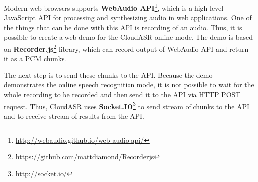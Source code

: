 Modern web browsers supports \textbf{WebAudio API}\footnote{\url{http://webaudio.github.io/web-audio-api/}},
  which is a high-level JavaScript API for processing and synthesizing audio in web applications.
One of the things that can be done with this API is recording of an audio.
Thus, it is possible to create a web demo for the CloudASR online mode.
The demo is based on \textbf{Recorder.js}\footnote{\url{https://github.com/mattdiamond/Recorderjs}} library,
  which can record output of WebAudio API and return it as a PCM chunks.

The next step is to send these chunks to the API.
Because the demo demonstrates the online speech recognition mode,
  it is not possible to wait for the whole recording to be recorded and then send it to the API via HTTP POST request.
Thus, CloudASR uses \textbf{Socket.IO}\footnote{\url{http://socket.io/}} to send stream of chunks to the API
  and to receive stream of results from the API.
